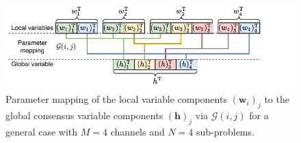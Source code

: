 \documentclass{article}
\newcommand{\hf}{{\bm{h}}}
\newcommand{\wf}{{\bm{w}}}
\begin{document}

\begin{figure}
    \centering
    \includegraphics[trim={0.3cm 0.25cm 1.7cm 0.0cm},clip,width=\columnwidth]{images/parameter_mapping2.pdf}
    \vspace*{-0.5cm}
    \caption{Parameter mapping of the local variable components \(({\wf}_i)_j\) to the global consensus variable components \(({\hf})_j\) via \(\mathcal{G}(i,j)\) for a general case with \(M=4\) channels and \(N=4\) sub-problems.}
    \label{fig:problem_splitting:problem_splitting_matrix}
\end{figure}

\end{document}
